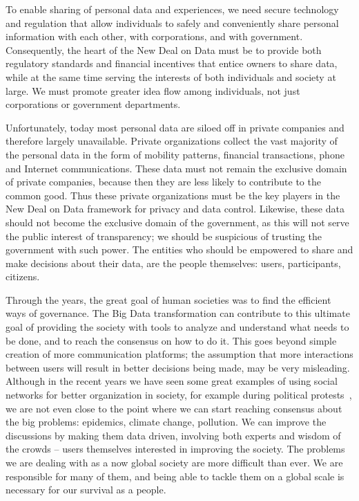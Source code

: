 To enable sharing of personal data and experiences, we need secure technology and regulation that allow individuals to safely and conveniently share personal information with each other, with corporations, and with government.
Consequently, the heart of the New Deal on Data must be to provide both regulatory standards and financial incentives that entice owners to share data, while at the same time serving the interests of both individuals and society at large.
We must promote greater idea flow among individuals, not just corporations or government departments.

Unfortunately, today most personal data are siloed off in private companies and therefore largely unavailable.
Private organizations collect the vast majority of the personal data in the form of mobility patterns, financial transactions, phone and Internet communications.
These data must not remain the exclusive domain of private companies, because then they are less likely to contribute to the common good.
Thus these private organizations must be the key players in the New Deal on Data framework for privacy and data control.
Likewise, these data should not become the exclusive domain of the government, as this will not serve the public interest of transparency; we should be suspicious of trusting the government with such power.
The entities who should be empowered to share and make decisions about their data, are the people themselves: users, participants, citizens.

Through the years, the great goal of human societies was to find the efficient ways of governance.
The Big Data transformation can contribute to this ultimate goal of providing the society with tools to analyze and understand what needs to be done, and to reach the consensus on how to do it.
This goes beyond simple creation of more communication platforms; the assumption that more interactions between users will result in better decisions being made, may be very misleading. 
Although in the recent years we have seen some great examples of using social networks for better organization in society, for example during political protests~\cite{grossman2009iran, barry2009protests}, we are not even close to the point where we can start reaching consensus about the big problems: epidemics, climate change, pollution.
We can improve the discussions by making them data driven, involving both experts and wisdom of the crowds -- users themselves interested in improving the society.
The problems we are dealing with as a now global society are more difficult than ever. 
We are responsible for many of them, and being able to tackle them on a global scale is necessary for our survival as a people.

